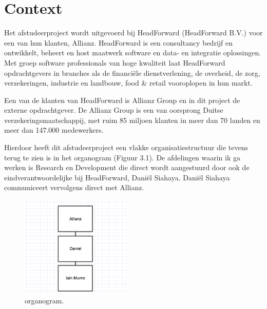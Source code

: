 \chapter{Context}
Het afstudeerproject wordt uitgevoerd bij HeadForward (HeadForward B.V.) voor een van hun klanten, Allianz. HeadForward is een consultancy bedrijf en ontwikkelt, beheert en host maatwerk software en data- en integratie oplossingen. Met groep software professionals van hoge kwaliteit laat HeadForward opdrachtgevers in branches als de financiële dienstverlening, de overheid, de zorg, verzekeringen, industrie en landbouw, food \& retail vooroplopen in hun markt. 

Een van de klanten van HeadForward is Allianz Group en in dit project de externe opdrachtgever. De Allianz Group is een van oorsprong Duitse verzekeringsmaatschappij, met ruim 85 miljoen klanten in meer dan 70 landen en meer dan 147.000 medewerkers. 

Hierdoor heeft dit afstudeerproject een vlakke organisatiestructuur die tevens terug te zien is in het organogram (Figuur 3.1). De afdelingen waarin ik ga werken is Research en Development die direct wordt aangestuurd door ook de eindverantwoordelijke bij HeadForward, Dani\"el Siahaya. Dani\"el Siahaya communiceert vervolgens direct met Allianz.

\begin{figure}[ht]
    \begin{center}
        \includegraphics[width=200px]{images/org.png}
        \caption{organogram.}
    \end{center}
\end{figure}